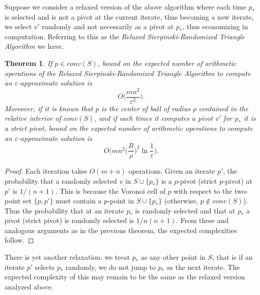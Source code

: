 \documentclass{article}
\newtheorem{thm}{Theorem}
\theoremstyle{definition}
\begin{document}
Suppose we consider a relaxed version of the above algorithm where each time $p_*$ is selected and is not a pivot at the current iterate, thus becoming a new iterate, we select $v'$ randomly and not necessarily as a pivot at $p_*$, thus economizing in computation.  Referring to this as the {\it Relaxed Sierpinski-Randomized Triangle Algorithm} we have.

\begin{thm} If $p \in conv(S)$, bound on the expected number of arithmetic operations of the Relaxed Sierpinski-Randomized Triangle Algorithm to compute an $\varepsilon$-approximate solution is
$$O \bigg (\frac{mn^2}{\varepsilon^2} \bigg ).$$
Moreover, if it is known that $p$ is the center of ball of radius $\rho$ contained in the relative interior of $conv(S)$, and if each times it computes a pivot $v'$ for $p_*$ it is a strict pivot, bound on the expected number of arithmetic operations to compute an $\varepsilon$-approximate solution is
$$O\bigg (mn^2 \bigg (\frac{R}{\rho} \bigg)^2 \ln \frac{1}{\varepsilon} \bigg).$$
\end{thm}
\begin{proof}  Each iteration takes $O(m+n)$ operations. Given an iterate $p'$,  the probability that a randomly selected $v$ in  $S \cup \{p_*\}$ is a $p$-pivot (strict $p$-pivot) at $p'$ is $1/(n+1)$. This is because the Voronoi cell of $p$ with respect to the two-point set $\{p,p'\}$ must contain a $p$-point in $S \cup \{p_*\}$ (otherwise, $p \not \in conv(S)$). Thus the probability that at an iterate $p_*$ is randomly selected and that at $p_*$ a pivot (strict pivot) is randomly selected is $1/n(n+1)$. From these and analogous arguments as in the previous theorem, the expected complexities follow.
\end{proof}

There is yet another relaxation: we treat $p_*$ as any other point in $S$, that is if an iterate $p'$ selects $p_*$ randomly,  we do not jump to $p_*$ as the next iterate. The expected complexity of this may remain to be the same as the relaxed version analyzed above.\\
\end{document}
